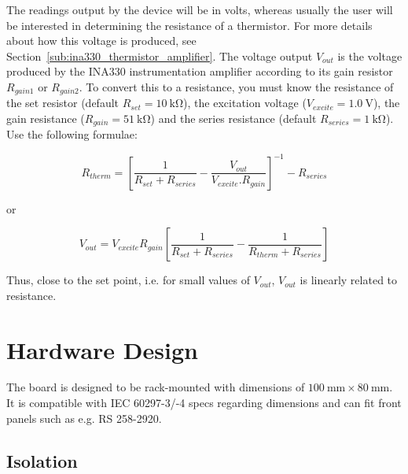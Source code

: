 \documentclass[11pt]{report}
\newcommand{\VExcite}{1.0}
\newcommand{\RGain}{\SI{51}{\kilo\ohm}}
\newcommand{\RSeries}{\SI{1}{\kilo\ohm}}
\newcommand{\RSet}{\SI{10}{\kilo\ohm}}
\begin{document}
The readings output by the device will be in volts, whereas usually the user will be interested in determining the resistance of a thermistor. For more details about how this voltage is produced, see Section~\ref{sub:ina330_thermistor_amplifier}. The voltage output $V_{out}$ is the voltage produced by the INA330 instrumentation amplifier according to its gain resistor $R_{gain1}$ or $R_{gain2}$. To convert this to a resistance, you must know the resistance of the set resistor (default $R_{set} = \RSet$), the excitation voltage ($V_{excite} = \SI{\VExcite}{\volt}$), the gain resistance ($R_{gain} = \RGain$) and the series resistance (default $R_{series} = \RSeries$). Use the following formulae:

\begin{equation}
\label{eq:volt_to_resistance}
R_{therm} = \left[ \frac{1}{R_{set} + R_{series}} - 
	\frac{V_{out}}{V_{excite} . R_{gain}} \right] ^ {-1}
	- R_{series}
\end{equation} 

or

\begin{equation}
\label{eq:resistance_to_voltage}
V_{out} = V_{excite} R_{gain} \left[ \frac{1}{R_{set} + R_{series}} - \frac{1}{R_{therm} + R_{series}} \right]
\end{equation} 

Thus, close to the set point, i.e. for small values of $V_{out}$, $V_{out}$ is linearly related to resistance. 


\chapter{Hardware Design} %
\label{sec:hardware_design}

The board is designed to be rack-mounted with dimensions of $\SI{100}{\mm} \times \SI{80}{\mm}$. It is compatible with IEC 60297-3/-4 specs regarding dimensions and can fit front panels such as e.g. RS 258-2920. 


\section{Isolation}
\end{document}

